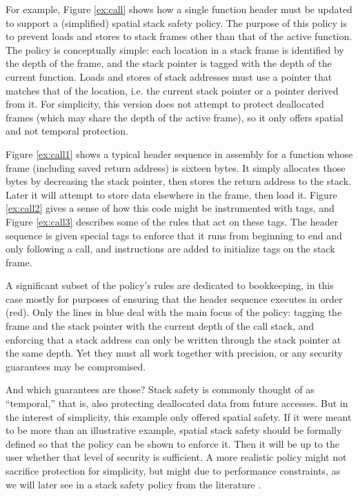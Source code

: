 \documentclass{report}
\begin{document}
For example, Figure \ref{ex:call} shows how a single function header must be updated to
support a (simplified) spatial stack safety policy. The purpose of this policy is to prevent
loads and stores to stack frames other than that of the active function.
The policy is conceptually simple:
each location in a stack frame is identified by the depth of the frame, and the stack pointer
is tagged with the depth of the current function.  Loads and stores of stack
addresses must use a pointer that matches that of the location, i.e. the current stack pointer
or a pointer derived from it. For simplicity, this version does not attempt to protect deallocated
frames (which may share the depth of the active frame), so it only offers spatial and not temporal
protection.

Figure \ref{ex:call1} shows a typical header sequence in assembly for a function whose frame
(including saved return address) is sixteen bytes. It simply allocates those bytes by decreasing
the stack pointer, then stores the return address to the stack. Later it will attempt to store data
elsewhere in the frame, then load it. Figure \ref{ex:call2} gives a sense of how
this code might be instrumented with tags, and Figure \ref{ex:call3} describes some of
the rules that act on these tags. The header sequence is given special tags to enforce
that it runs from beginning to end and only following a call, and instructions are added
to initialize tags on the stack frame.

A significant subset of the policy's rules are dedicated to bookkeeping, in this case
mostly for purposes of ensuring that the header sequence executes in order (red).
Only the lines in blue deal with the main focus of the policy:
tagging the frame and the stack pointer with the current depth of the call stack, and enforcing
that a stack address can only be written through the stack pointer at the same depth.
Yet they must all work together with precision, or any security guarantees may be compromised.

And which guarantees are those? Stack safety is commonly thought of as ``temporal,'' that is,
also protecting deallocated data from future accesses. But in the interest of simplicity,
this example only offered spatial safety. If it were meant to be more than an illustrative
example, spatial stack safety should be formally defined so that the policy can be shown
to enforce it. Then it will be up to the user whether that level of security is sufficient.
A more realistic policy might not sacrifice protection for simplicity, but might due to
performance constraints, as we will later see in a stack safety policy from the
literature \cite{RoesslerD18}.
\end{document}
